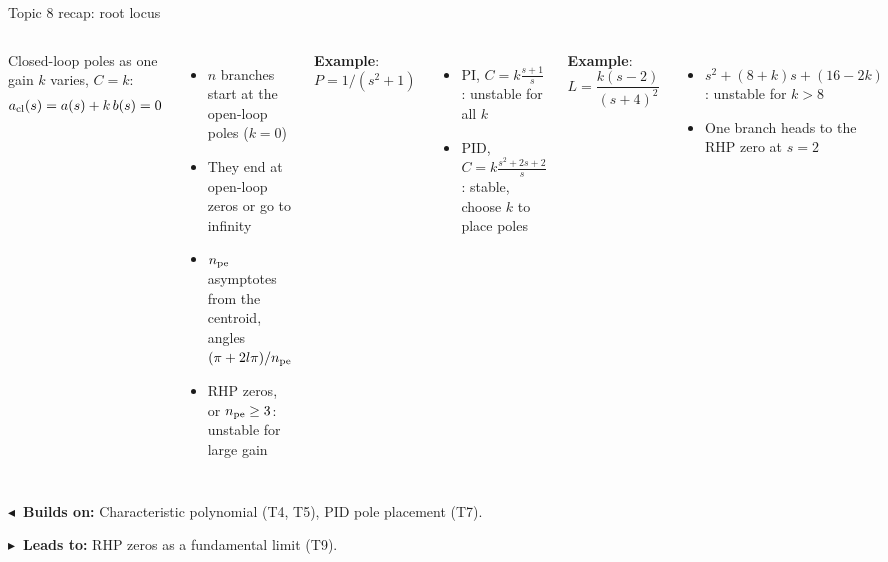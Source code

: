 \documentclass[10pt]{beamer-control}
\newcommand\LINKS[2]{%
  \par\vfill
  {\scriptsize\setlength\fboxsep{3pt}%
  \colorbox{AUHighlight!10}{\parbox{\dimexpr\linewidth-6pt\relax}{%
    \textbf{\color{AUHighlight}$\blacktriangleleft$~Builds on:} #1\par
    \textbf{\color{AUHighlight}$\blacktriangleright$~Leads to:} #2%
    \hfill\hyperlink{coursemap}{\beamerbutton{Course map}}}}}%
}
\begin{document}
\begin{frame}{Topic 8 recap: root locus}
  \begin{columns}[t]
    \footnotesize
    Closed-loop poles as one gain $k$ varies, $C = k$:
    \begin{align*}
      a_{\text{cl}}(s) = a(s) + k\,b(s) = 0
    \end{align*}
    \begin{itemize}
      \item $n$ branches start at the open-loop poles ($k=0$)
      \item They end at open-loop zeros or go to infinity
      \item $n_{\text{pe}}$ asymptotes from the centroid, angles $(\pi + 2l\pi)/n_{\text{pe}}$
      \item RHP zeros, or $n_{\text{pe}} \ge 3$: \alert{unstable for large gain}
    \end{itemize}
    \footnotesize
    \textbf{Example}: $P = 1/(s^2+1)$
    \begin{itemize}
      \item PI, $C = k\frac{s+1}{s}$: unstable for all $k$
      \item PID, $C = k\frac{s^2+2s+2}{s}$: stable, choose $k$ to place poles
    \end{itemize}
    \textbf{Example}: $L = \dfrac{k(s-2)}{(s+4)^2}$
    \begin{itemize}
      \item $s^2 + (8+k)s + (16-2k)$: unstable for $k>8$
      \item One branch heads to the RHP zero at $s=2$
    \end{itemize}
  \end{columns}
  \LINKS{Characteristic polynomial (T4, T5), PID pole placement (T7).}{RHP zeros as a fundamental limit (T9).}
\end{frame}

\end{document}
